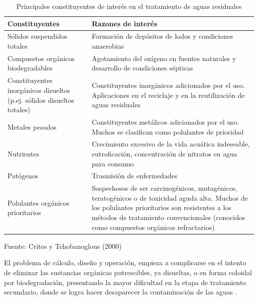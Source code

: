 	\begin{table}[!ht]
	\caption{Principales constituyentes de interés en el tratamiento de aguas residuales}\label{tab:constituyentes}
	\begin{center}
		\begin{footnotesize}
		\begin{tabular}{ | m{5cm} | m{10cm} | }
		\hline
		\rowcolor{blanc}
		{\textbf{Constituyentes}} & {\textbf{Razones de interés}}\\ 
		\hline 
		Sólidos suspendidos totales & Formación de depósitos de lodos y condiciones anaerobias\par \\ 
		
		Compuestos orgánicos biodegradables & Agotamiento del oxígeno en fuentes naturales y desarrollo de condiciones sépticas\par \\
		
		Constituyentes inorgánicos disueltos (p.ej. sólidos disueltos totales) & Constituyentes inorgánicos adicionados por el uso. Aplicaciones en el reciclaje y en la reutilización de aguas residuales\par \\
		
		Metales pesados & Constituyentes metálicos adicionados por el uso. Muchos se clasifican como polulantes de prioridad\par \\
		
		Nutrientes & Crecimiento excesivo de la vida acuática indeseable, eutroficación, concentración de nitratos en agua para consumo\par \\
		
		Patógenos & Trasmisión de enfermedades\par \\
		
		Polulantes orgánicos prioritarios & Sospechosos de ser carcinogénicos, mutagénicos, teratogénicos o de toxicidad aguda alta. Muchos de los polulantes prioritarios son resistentes a los métodos de tratamiento convencionales (conocidos como compuestos orgánicos refractarios)\\
		\hline
		\end{tabular}
		{\small{Fuente: Crites y Tchobanoglous (2000)}}
		\end{footnotesize}
	\end{center}
	\end{table}
El problema de cálculo, diseño y operación, empieza a complicarse en el intento de eliminar las sustancias orgánicas putrescibles, ya disueltas, o en forma coloidal por biodegradación, presentando la mayor dificultad en la etapa de tratamiento secundario, donde se logra hacer desaparecer la contaminación de las aguas \emph{\citep{delapena13}}.\\
